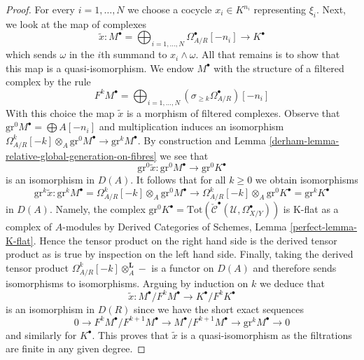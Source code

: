 \begin{proof}
\medskip\noindent
For every $i = 1, \ldots, N$ we choose a cocycle $x_i \in K^{n_i}$
representing $\xi_i$. Next, we look at the map of complexes
$$
\tilde x :
M^\bullet = \bigoplus\nolimits_{i = 1, \ldots, N}
\Omega^\bullet_{A/R}[-n_i]
\longrightarrow
K^\bullet
$$
which sends $\omega$ in the $i$th summand to $x_i \wedge \omega$.
All that remains is to show that this map is a quasi-isomorphism.
We endow $M^\bullet$ with the structure of a filtered complex
by the rule
$$
F^kM^\bullet =
\bigoplus\nolimits_{i = 1, \ldots, N}
(\sigma_{\geq k}\Omega^\bullet_{A/R})[-n_i]
$$
With this choice the map $\tilde x$ is a morphism of filtered complexes.
Observe that $\text{gr}^0M^\bullet = \bigoplus A[-n_i]$
and multiplication induces an isomorphism
$\Omega^k_{A/R}[-k] \otimes_A \text{gr}^0M^\bullet \to \text{gr}^kM^\bullet$.
By construction and Lemma \ref{derham-lemma-relative-global-generation-on-fibres}
we see that
$$
\text{gr}^0\tilde x :
\text{gr}^0M^\bullet \longrightarrow
\text{gr}^0K^\bullet
$$
is an isomorphism in $D(A)$. It follows that for all $k \geq 0$
we obtain isomorphisms
$$
\text{gr}^k \tilde x :
\text{gr}^kM^\bullet = \Omega^k_{A/R}[-k] \otimes_A \text{gr}^0M^\bullet
\longrightarrow
\Omega^k_{A/R}[-k] \otimes_A \text{gr}^0K^\bullet =
\text{gr}^kK^\bullet
$$
in $D(A)$. Namely, the complex
$\text{gr}^0K^\bullet =
\text{Tot}(\check{\mathcal{C}}^\bullet(\mathcal{U}, \Omega_{X/Y}^\bullet))$
is K-flat as a complex of $A$-modules by Derived Categories of Schemes,
Lemma \ref{perfect-lemma-K-flat}.
Hence the tensor product on the right hand side is the
derived tensor product as is true by inspection on the left hand side.
Finally, taking the derived tensor product
$\Omega^k_{A/R}[-k] \otimes_A^\mathbf{L} -$ is a functor on $D(A)$
and therefore sends isomorphisms to isomorphisms.
Arguing by induction on $k$ we deduce that
$$
\tilde x : M^\bullet/F^kM^\bullet \to K^\bullet/F^kK^\bullet
$$
is an isomorphism in $D(R)$ since we have the short exact sequences
$$
0 \to F^kM^\bullet/F^{k + 1}M^\bullet \to
M^\bullet/F^{k + 1}M^\bullet \to
\text{gr}^kM^\bullet \to 0
$$
and similarly for $K^\bullet$. This proves that $\tilde x$ is a
quasi-isomorphism as the filtrations are finite in any given degree.
\end{proof}

